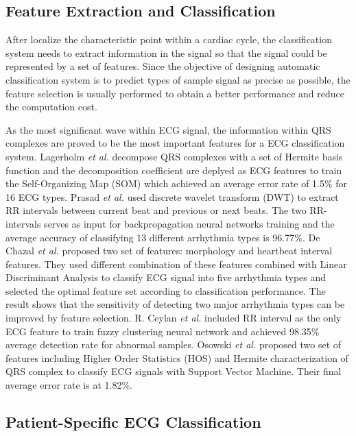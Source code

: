 \subsection{Feature Extraction and Classification}

After localize the characteristic point within a cardiac cycle, the classification system needs to extract information in the signal so that the signal could be represented by a set of features. Since the objective of designing automatic classification system is to predict types of sample signal as precise as possible, the feature selection is usually performed to obtain a better performance and reduce the computation cost\cite{lagerholm2000clustering, prasad2003classification, autofs, ceylan2009novel, osowski2004support}. 

As the most significant wave within ECG signal, the information within QRS complexes are proved to be the most important features for a ECG classification system. Lagerholm \textit{et al.} decompose QRS complexes with a set of Hermite basis function and the decomposition coefficient are deplyed as ECG features to train the Self-Organizing Map (SOM) which achieved an average error rate of 1.5\% for 16 ECG types\cite{lagerholm2000clustering}. Prasad \textit{et al.}\cite{prasad2003classification} used discrete wavelet transform (DWT) to extract RR intervals between current beat and previous or next beats. The two RR-intervals serves as input for backpropagation neural networks training and the average accuracy of classifying 13 different arrhythmia types is 96.77\%. De Chazal \textit{et al.} proposed two set of features: morphology and heartbeat interval features. They used different combination of these features combined with Linear Discriminant Analysis to classify ECG signal into five arrhythmia types and selected the optimal feature set according to classification performance\cite{autofs}. The result shows that the sensitivity of detecting two major arrhythmia types can be improved by feature selection. R. Ceylan \textit{et al.}\cite{ceylan2009novel} included RR interval as the only ECG feature to train fuzzy clustering neural network and achieved 98.35\% average detection rate for abnormal samples. Osowski \textit{et al.} proposed two set of features including Higher Order Statistics (HOS) and Hermite characterization of QRS complex to classify ECG signals with Support Vector Machine. Their final average error rate is at 1.82\%\cite{osowski2004support}. %

\subsection{Patient-Specific ECG Classification}

